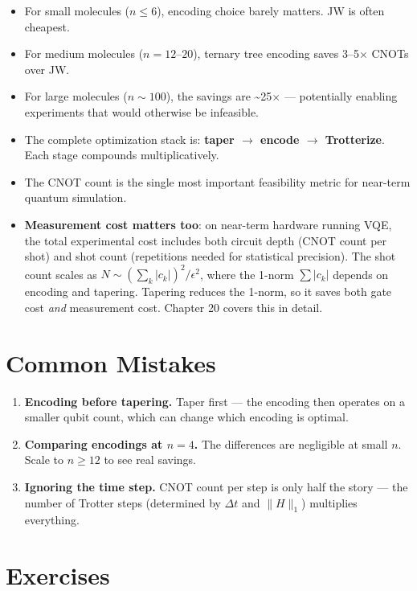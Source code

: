 \documentclass[
  11pt,
  oneside]{book}
\providecommand{\tightlist}{%
  \setlength{\itemsep}{0pt}\setlength{\parskip}{0pt}}
\begin{document}
\begin{itemize}
\tightlist
\item
  For small molecules (\(n \leq 6\)), encoding choice barely matters. JW
  is often cheapest.
\item
  For medium molecules (\(n = 12\)--\(20\)), ternary tree encoding saves
  3--5$\times$ CNOTs over JW.
\item
  For large molecules (\(n \sim 100\)), the savings are
  \textasciitilde25$\times$ --- potentially enabling experiments that would
  otherwise be infeasible.
\item
  The complete optimization stack is: \textbf{taper $\rightarrow$ encode $\rightarrow$
  Trotterize}. Each stage compounds multiplicatively.
\item
  The CNOT count is the single most important feasibility metric for
  near-term quantum simulation.
\item
  \textbf{Measurement cost matters too}: on near-term hardware running
  VQE, the total experimental cost includes both circuit depth (CNOT
  count per shot) and shot count (repetitions needed for statistical
  precision). The shot count scales as
  \(N \sim (\sum_k |c_k|)^2 / \epsilon^2\), where the 1-norm
  \(\sum |c_k|\) depends on encoding and tapering. Tapering reduces the
  1-norm, so it saves both gate cost \emph{and} measurement cost.
  Chapter 20 covers this in detail.
\end{itemize}

\section{Common Mistakes}\label{common-mistakes-11}

\begin{enumerate}
\def\labelenumi{\arabic{enumi}.}
\item
  \textbf{Encoding before tapering.} Taper first --- the encoding then
  operates on a smaller qubit count, which can change which encoding is
  optimal.
\item
  \textbf{Comparing encodings at \(n = 4\).} The differences are
  negligible at small \(n\). Scale to \(n \geq 12\) to see real savings.
\item
  \textbf{Ignoring the time step.} CNOT count per step is only half the
  story --- the number of Trotter steps (determined by \(\Delta t\) and
  \(\lVert H \rVert_1\)) multiplies everything.
\end{enumerate}

\section{Exercises}\label{exercises-11}
\end{document}
